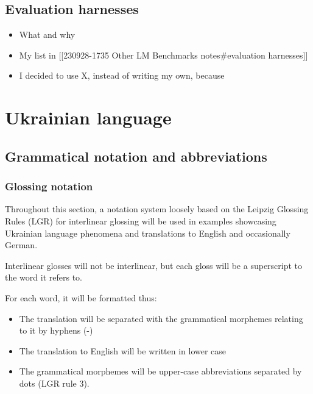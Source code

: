 \subsection{Evaluation harnesses}\label{evaluation-harnesses}

\begin{itemize}
\tightlist
\item
  What and why
\item
  My list in {[}{[}230928-1735 Other LM Benchmarks
  notes\#\textquotesingle evaluation harness\textquotesingle es{]}{]}
\item
  I decided to use X, instead of writing my own, because
\end{itemize}

\section{Ukrainian language}\label{ukrainian-language}

\subsection{Grammatical notation and
abbreviations}\label{grammatical-notation-and-abbreviations}

\subsubsection{Glossing notation}\label{glossing-notation}

Throughout this section, a notation system loosely based on the Leipzig
Glossing Rules\cite{comrie2008leipzig} (LGR) for interlinear glossing
will be used in examples showcasing Ukrainian language phenomena and
translations to English and occasionally German.

Interlinear glosses will not be interlinear, but each gloss will be a
superscript to the word it refers to.

For each word, it will be formatted thus:

\begin{itemize}
\tightlist
\item
  The translation will be separated with the grammatical morphemes
  relating to it by hyphens (-)
\item
  The translation to English will be written in lower case
\item
  The grammatical morphemes will be upper-case abbreviations separated
  by dots (LGR rule 3).
\end{itemize}

